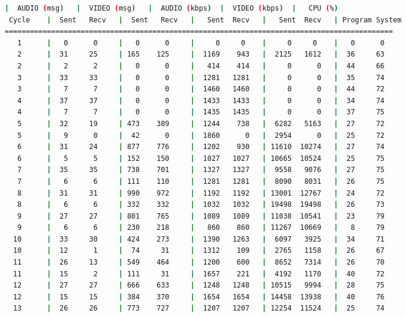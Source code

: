 \begin{adjustbox}{max width=\textwidth}
\begin{lstlisting}[language=bash,basicstyle=\ttfamily\scriptsize]
          |  AUDIO (msg)   |  VIDEO (msg)   |  AUDIO (kbps)  |  VIDEO (kbps)  |   CPU (%)
 Cycle    |  Sent   Recv   |  Sent   Recv   |   Sent  Recv   |   Sent  Recv   | Program System
============================================================================================
   1      |   0      0     |   0      0     |     0     0    |     0     0    |   0      0
   2      |  31     25     | 165    125     |  1169    943   |  2125   1612   |  36     63
   2      |   2      2     |   0      0     |   414    414   |     0      0   |  44     66
   3      |  33     33     |   0      0     |  1281   1281   |     0      0   |  35     74
   3      |   7      7     |   0      0     |  1460   1460   |     0      0   |  44     72
   4      |  37     37     |   0      0     |  1433   1433   |     0      0   |  34     74
   4      |   7      7     |   0      0     |  1435   1435   |     0      0   |  37     75
   5      |  32     19     | 473    389     |  1244    738   |  6282   5163   |  27     72
   5      |   9      0     |  42      0     |  1860      0   |  2954      0   |  25     72
   6      |  31     24     | 877    776     |  1202    930   | 11610  10274   |  27     74
   6      |   5      5     | 152    150     |  1027   1027   | 10665  10524   |  25     75
   7      |  35     35     | 738    701     |  1327   1327   |  9558   9076   |  27     75
   7      |   6      6     | 111    110     |  1281   1281   |  8090   8031   |  26     75
   8      |  31     31     | 990    972     |  1192   1192   | 13001  12767   |  24     72
   8      |   6      6     | 332    332     |  1032   1032   | 19498  19498   |  26     73
   9      |  27     27     | 801    765     |  1089   1089   | 11038  10541   |  23     79
   9      |   6      6     | 230    218     |   860    860   | 11267  10669   |   8     79
  10      |  33     30     | 424    273     |  1390   1263   |  6097   3925   |  34     71
  10      |  12      1     |  74     31     |  1312    109   |  2765   1158   |  26     67
  11      |  26     13     | 549    464     |  1200    600   |  8652   7314   |  26     70
  11      |  15      2     | 111     31     |  1657    221   |  4192   1170   |  40     72
  12      |  27     27     | 666    633     |  1248   1248   | 10515   9994   |  28     75
  12      |  15     15     | 384    370     |  1654   1654   | 14458  13938   |  40     76
  13      |  26     26     | 773    727     |  1207   1207   | 12254  11524   |  25     74

\end{lstlisting}
\end{adjustbox}
